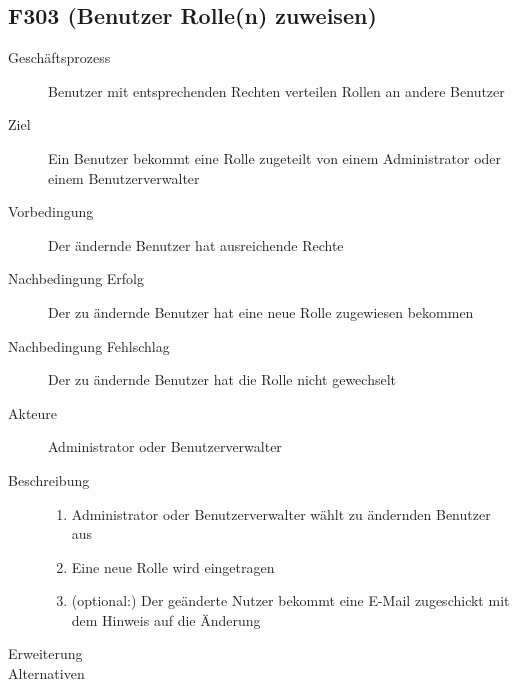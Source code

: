 \subsection{F303 (Benutzer Rolle(n) zuweisen)}
\begin{description}
  \item[Geschäftsprozess]Benutzer mit entsprechenden Rechten verteilen Rollen an andere Benutzer
  \item[Ziel]Ein Benutzer bekommt eine Rolle zugeteilt von einem Administrator oder einem Benutzerverwalter
  \item[Vorbedingung]Der ändernde Benutzer hat ausreichende Rechte
  \item[Nachbedingung Erfolg]Der zu ändernde Benutzer hat eine neue Rolle zugewiesen bekommen
  \item[Nachbedingung Fehlschlag]Der zu ändernde Benutzer hat die Rolle nicht gewechselt
  \item[Akteure]Administrator oder Benutzerverwalter
  \item[Beschreibung]\hfill
  \begin{enumerate}
  \item Administrator oder Benutzerverwalter wählt zu ändernden Benutzer aus
  \item Eine neue Rolle wird eingetragen
  \item (optional:) Der geänderte Nutzer bekommt eine E-Mail zugeschickt mit dem Hinweis auf die Änderung
  \end{enumerate}
  \item[Erweiterung]
  \item[Alternativen]
\end{description}
